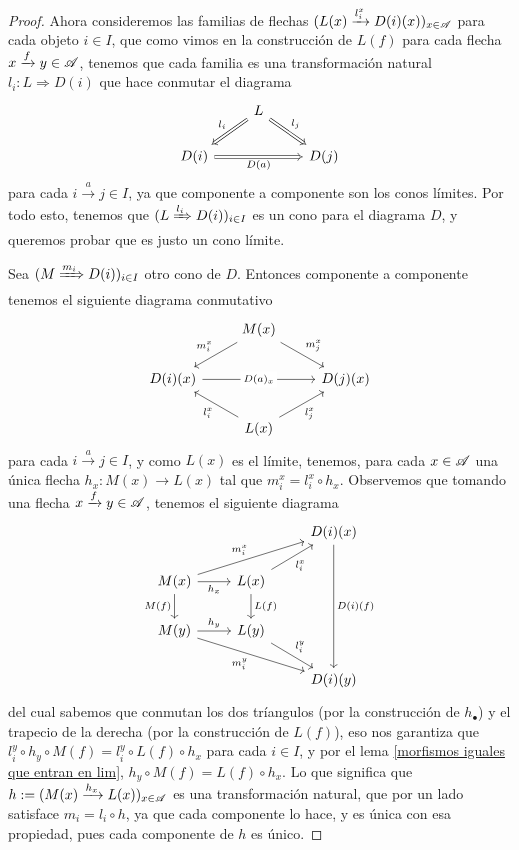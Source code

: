 \documentclass{comunicaciones}
\begin{document}
\begin{proof}
    Ahora consideremos las familias de flechas $(L(x)\xrightarrow{l^x_i}D(i)(x))_{x\in \mathscr A}$ para cada objeto $i\in I$, que como vimos en la construcción
    de $L(f)$ para cada flecha $x\xrightarrow{f}y\in\mathscr A$, tenemos que cada familia es una transformación natural $l_i:L\Rightarrow D(i)$ que hace conmutar
    el diagrama 
    \[\begin{tikzcd}
        & L \\
        {D(i)} && {D(j)}
        \arrow["{l_i}"', Rightarrow, from=1-2, to=2-1]
        \arrow["{l_j}", Rightarrow, from=1-2, to=2-3]
        \arrow["{D(a)}"', Rightarrow, from=2-1, to=2-3]
    \end{tikzcd}\]
    para cada $i\xrightarrow{a}j\in I$, ya que componente a componente son los conos límites. Por todo esto, tenemos que $(L\xRightarrow{l_i}D(i))_{i\in I}$
    es un cono para el diagrama $D$, y queremos probar que es justo un cono límite.

    Sea $(M\xRightarrow{m_i}D(i))_{i\in I}$ otro cono de $D$. Entonces componente a componente tenemos el siguiente diagrama conmutativo
    \[\begin{tikzcd}
        & {M(x)} \\
        {D(i)(x)} && {D(j)(x)} \\
        & {L(x)}
        \arrow["{m^x_i}"', from=1-2, to=2-1]
        \arrow["{m^x_j}", from=1-2, to=2-3]
        \arrow["{D(a)_x}"{description}, from=2-1, to=2-3]
        \arrow["{l^x_i}", from=3-2, to=2-1]
        \arrow["{l^x_j}"', from=3-2, to=2-3]
    \end{tikzcd}\]
    para cada $i\xrightarrow{a}j\in I$, y como $L(x)$ es el límite, tenemos, para cada $x\in\mathscr A$ una única flecha $h_x:M(x)\to L(x)$ tal que 
    $m^x_i=l^x_i\circ h_x$. Observemos que tomando una flecha $x\xrightarrow{f}y\in\mathscr A$, tenemos el siguiente diagrama
    \[\begin{tikzcd}
        && {D(i)(x)} \\
        {M(x)} & {L(x)} \\
        {M(y)} & {L(y)} \\
        && {D(i)(y)}
        \arrow["{D(i)(f)}", from=1-3, to=4-3]
        \arrow["{m^x_i}", from=2-1, to=1-3]
        \arrow["{h_x}"', from=2-1, to=2-2]
        \arrow["{M(f)}"', from=2-1, to=3-1]
        \arrow["{l^x_i}"', from=2-2, to=1-3]
        \arrow["{L(f)}", from=2-2, to=3-2]
        \arrow["{h_y}", from=3-1, to=3-2]
        \arrow["{m^y_i}"', from=3-1, to=4-3]
        \arrow["{l^y_i}", from=3-2, to=4-3]
    \end{tikzcd}\]
    del cual sabemos que conmutan los dos tríangulos (por la construcción de $h_\bullet$) y el trapecio de la derecha (por la construcción de $L(f)$),
    eso nos garantiza que $l^y_i\circ h_y\circ M(f)=l^y_i\circ L(f)\circ h_x$ para cada $i\in I$, y por el lema \ref{morfismos iguales que entran en lim},
    $h_y\circ M(f)=L(f)\circ h_x$. Lo que significa que $h:=(M(x)\xrightarrow{h_x}L(x))_{x\in\mathscr A}$ es una transformación natural, que por un lado satisface
    $m_i=l_i\circ h$, ya que cada componente lo hace, y es única con esa propiedad, pues cada componente de $h$ es único.
\end{proof}
\end{document}
